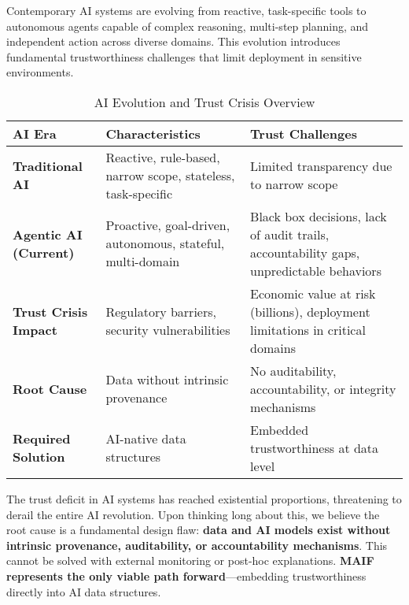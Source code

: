 \documentclass[conference]{IEEEtran}
\begin{document}
Contemporary AI systems are evolving from reactive, task-specific tools to autonomous agents capable of complex reasoning, multi-step planning, and independent action across diverse domains. This evolution introduces fundamental trustworthiness challenges that limit deployment in sensitive environments.

\begin{table*}[!t]
\renewcommand{\arraystretch}{1.3}
\caption{AI Evolution and Trust Crisis Overview}
\label{tab:ai-evolution-crisis}
\centering
\footnotesize
\begin{tabular}{p{3cm}p{5cm}p{6cm}}
\toprule
\textbf{AI Era} & \textbf{Characteristics} & \textbf{Trust Challenges} \\
\midrule
\textbf{Traditional AI} & Reactive, rule-based, narrow scope, stateless, task-specific & Limited transparency due to narrow scope \\
\textbf{Agentic AI (Current)} & Proactive, goal-driven, autonomous, stateful, multi-domain & Black box decisions, lack of audit trails, accountability gaps, unpredictable behaviors \\
\textbf{Trust Crisis Impact} & Regulatory barriers, security vulnerabilities & Economic value at risk (billions), deployment limitations in critical domains \\
\textbf{Root Cause} & Data without intrinsic provenance & No auditability, accountability, or integrity mechanisms \\
\textbf{Required Solution} & AI-native data structures & Embedded trustworthiness at data level \\
\bottomrule
\end{tabular}
\end{table*}

The trust deficit in AI systems has reached existential proportions, threatening to derail the entire AI revolution. Upon thinking long about this, we believe the root cause is a fundamental design flaw: \textbf{data and AI models exist without intrinsic provenance, auditability, or accountability mechanisms}. This cannot be solved with external monitoring or post-hoc explanations. \textbf{MAIF represents the only viable path forward}—embedding trustworthiness directly into AI data structures.
\end{document}
